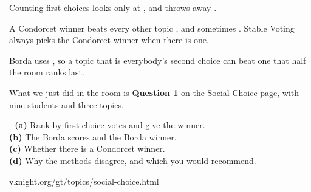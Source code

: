 \vspace{0.9cm}

{\large Counting first choices looks only at
, and throws away
.}

\vspace{1.1cm}

{\large A Condorcet winner beats every other topic
, and sometimes
. Stable Voting always picks the Condorcet winner
when there is one.}

\vspace{1.1cm}

{\large Borda uses , so a topic that is
everybody's second choice can beat one that half the room ranks last.}

\newpage
{}

\vspace{0.5cm}

{\large What we just did in the room is \textbf{Question 1} on the Social
Choice page, with nine students and three topics.}

\vspace{0.9cm}

\hspace{0.6cm}
\begin{minipage}{0.92\linewidth}
{\large
\begin{tabbing}
\hspace{1.2cm} \= \hspace{17cm} \= \kill
\textbf{(a)} \> Rank by first choice votes and give the winner. \> [2]\\[0.55em]
\textbf{(b)} \> The Borda scores and the Borda winner. \> [4]\\[0.55em]
\textbf{(c)} \> Whether there is a Condorcet winner. \> [4]\\[0.55em]
\textbf{(d)} \> Why the methods disagree, and which you would
  recommend. \> [5]
\end{tabbing}}
\end{minipage}

\vspace{1.2cm}

\begin{center}
{\large\color{inkgrey} vknight.org/gt/topics/social-choice.html}
\end{center}

